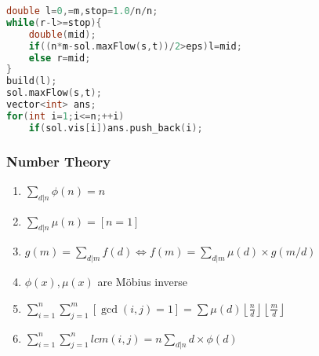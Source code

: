 \begin{enumerate}
\begin{enumerate}
	\end{enumerate}
\end{enumerate}
\begin{lstlisting}[language=C++]
double l=0,=m,stop=1.0/n/n;
while(r-l>=stop){
	double(mid);
	if((n*m-sol.maxFlow(s,t))/2>eps)l=mid;
	else r=mid;
}
build(l);
sol.maxFlow(s,t);
vector<int> ans;
for(int i=1;i<=n;++i)
	if(sol.vis[i])ans.push_back(i);
\end{lstlisting}



\subsubsection{Number Theory}
\begin{enumerate}\itemsep = -3pt
  \item $\sum_{d|n} \phi(n) = n$
  \item $\sum_{d|n} \mu (n)=[n=1]$
  \item $g(m)=\sum_{d|m}f(d)\Leftrightarrow f(m)=\sum_{d|m}\mu (d) \times g(m/d)$
  \item $\phi(x), \mu(x)$ are Möbius inverse
  \item $\sum_{i=1}^n\sum_{j=1}^m [\gcd(i, j) = 1]=\sum \mu(d)\left \lfloor \frac{n}{d} \right \rfloor \left \lfloor \frac{m}{d} \right \rfloor$
  \item $\sum_{i=1}^n\sum_{j=1}^nlcm(i,j)=n\sum_{d|n} d \times \phi (d)$
\end{enumerate}

